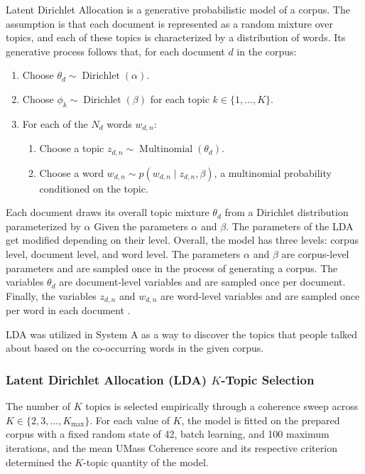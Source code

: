 Latent Dirichlet Allocation is a generative probabilistic model of a corpus. The
assumption is that each document is represented as a random mixture over
topics, and each of these topics is characterized by a distribution of
words. Its generative process follows that, for each document $d$ in the
corpus:

\begin{enumerate}[label=\arabic*.]
	\item Choose $\theta_d \sim \operatorname{Dirichlet}(\alpha)$.
	\item Choose $\phi_k \sim \operatorname{Dirichlet}(\beta)$ for each topic
	$k \in \{1,\dots,K\}$.
	\item For each of the $N_d$ words $w_{d,n}$:
	\begin{enumerate}[label=\alph*.]
		\item Choose a topic $z_{d,n} \sim \operatorname{Multinomial}(\theta_d)$.
		\item Choose a word $w_{d,n} \sim p(w_{d,n} \mid z_{d,n}, \beta)$, a
		multinomial probability conditioned on the topic.
	\end{enumerate}
\end{enumerate}

Each document draws its overall topic mixture $\theta_d$ from a Dirichlet
distribution parameterized by $\alpha$ Given the parameters $\alpha$ and $\beta$. The parameters of the LDA get modified depending on their level. Overall, the
model has three levels: corpus level, document level, and word level. The
parameters $\alpha$ and $\beta$ are corpus-level parameters and are sampled once
in the process of generating a corpus. The variables $\theta_d$ are
document-level variables and are sampled once per document. Finally, the
variables $z_{d,n}$ and $w_{d,n}$ are word-level variables and are sampled once
per word in each document \parencite{blei2003}.

LDA was utilized in System A as a way to discover the
topics that people talked about based on the co-occurring words in the given corpus.

\subsubsection{Latent Dirichlet Allocation (LDA) $K$-Topic Selection}

The number of $K$ topics is selected empirically through a coherence
sweep across $K \in \{2,3,\dots,K_{\max}\}$. For each value of $K$, the model
is fitted on the prepared corpus with a fixed random state of 42, batch
learning, and 100 maximum iterations, and the mean UMass Coherence score and
its respective criterion determined the $K$-topic quantity of the model.

